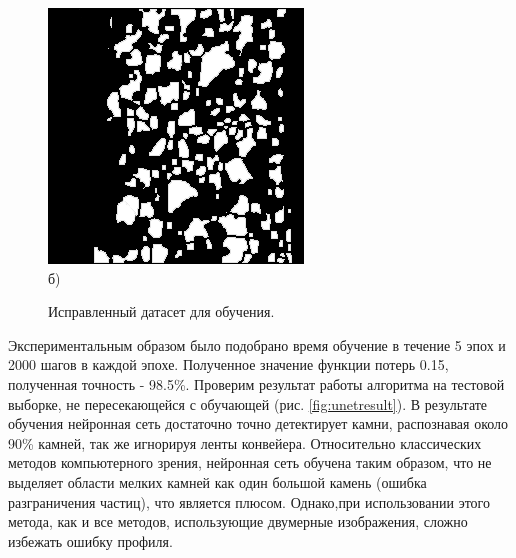 \documentclass[times]{itmo-student-thesis}
\begin{document}
\begin{figure}[h!]
\begin{minipage}[h]{0.49\linewidth}
 		\includegraphics[width=\linewidth]{images/train4} \\ б)
 	\end{minipage}
 	\caption{Исправленный датасет для обучения.}
 	\label{fig:newdataset}
 \end{figure}
 
 Экспериментальным образом было подобрано время обучение в течение 5 эпох и 2000 шагов в каждой эпохе. Полученное значение функции потерь 0.15, полученная точность - 98.5\%. Проверим результат работы алгоритма на тестовой выборке, не пересекающейся с обучающей (рис. \ref{fig:unetresult}). В результате обучения нейронная сеть достаточно точно детектирует камни, распознавая около 90\% камней, так же игнорируя ленты конвейера. Относительно классических методов компьютерного зрения, нейронная сеть обучена таким образом, что не выделяет области мелких камней как один большой камень (ошибка разграничения частиц), что является плюсом. Однако,при использовании этого метода,  как и все методов, использующие двумерные изображения, сложно избежать ошибку профиля.  
 
\end{document}
